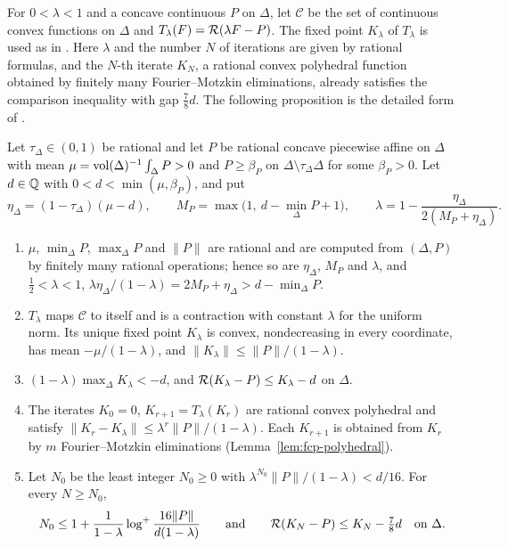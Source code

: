 For $0<\lambda<1$ and a concave continuous $P$ on $\Delta$, let $\mathcal C$ be the set of continuous convex functions on
$\Delta$ and $T_\lambda(F)=\mathcal{R}(\lambda F-P)$. The fixed point $K_\lambda$ of $T_\lambda$ is used as in
\cite[\S2.2]{OpenAI2026}. Here $\lambda$ and the number $N$ of iterations are given by rational formulas, and the
$N$-th iterate $K_N$, a rational convex polyhedral function obtained by finitely many Fourier--Motzkin eliminations,
already satisfies the comparison inequality with gap $\tfrac78d$. The following proposition is the detailed form of
.

\begin{proposition}\label{prop:fcp-fixed-point}
Let $\tau_\Delta\in(0,1)$ be rational and let $P$ be rational concave piecewise affine on $\Delta$ with mean
$\mu=\operatorname{vol}(\Delta)^{-1}\int_\Delta P>0$ and $P\ge\beta_P$ on $\Delta\setminus\tau_\Delta\Delta$ for some $\beta_P>0$. Let
$d\in\mathbb{Q}$ with $0<d<\min(\mu,\beta_P)$, and put
\[
 \eta_\Delta=(1-\tau_\Delta)(\mu-d),\qquad M_P=\max\bigl(1,\ d-\min_\Delta P+1\bigr),\qquad
 \lambda=1-\frac{\eta_\Delta}{2(M_P+\eta_\Delta)} .
\]
\begin{enumerate}[label=(\alph*)]
\item $\mu$, $\min_\Delta P$, $\max_\Delta P$ and $\|P\|$ are rational and are computed from $(\Delta,P)$ by finitely
 many rational operations; hence so are $\eta_\Delta$, $M_P$ and $\lambda$, and $\tfrac12<\lambda<1$,
 $\lambda\eta_\Delta/(1-\lambda)=2M_P+\eta_\Delta>d-\min_\Delta P$.
\item $T_\lambda$ maps $\mathcal C$ to itself and is a contraction with constant $\lambda$ for the uniform norm. Its
 unique fixed point $K_\lambda$ is convex, nondecreasing in every coordinate, has mean $-\mu/(1-\lambda)$, and
 $\|K_\lambda\|\le\|P\|/(1-\lambda)$.
\item $(1-\lambda)\max_\Delta K_\lambda<-d$, and $\mathcal{R}(K_\lambda-P)\le K_\lambda-d$ on $\Delta$.
\item The iterates $K_0=0$, $K_{r+1}=T_\lambda(K_r)$ are rational convex polyhedral and satisfy
 $\|K_r-K_\lambda\|\le\lambda^r\|P\|/(1-\lambda)$. Each $K_{r+1}$ is obtained from $K_r$ by $m$ Fourier--Motzkin
 eliminations (Lemma~\ref{lem:fcp-polyhedral}).
\item Let $N_0$ be the least integer $N_0\ge0$ with $\lambda^{N_0}\|P\|/(1-\lambda)<d/16$. For every $N\ge N_0$,
 \[
  N_0\le1+\frac1{1-\lambda}\log^+\frac{16\|P\|}{d(1-\lambda)}\qquad\text{and}\qquad
  \mathcal{R}(K_N-P)\le K_N-\tfrac78d\quad\text{on }\Delta .
 \]
\end{enumerate}
\end{proposition}

